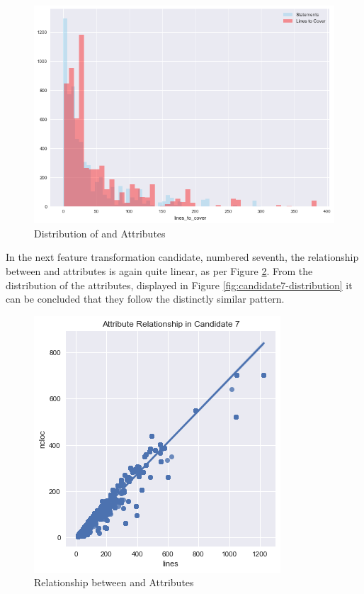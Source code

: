 \begin{figure}
    \centering
    \includegraphics[scale=0.6]{Figures/correlation/Attribute_Distribution_in_Candidate_6.png}
    \caption{Distribution of \statements{} and \linesToCover{} Attributes}
    \label{fig:candidate6-distribution}
\end{figure}

In the next feature transformation candidate, numbered seventh, the relationship between \ncloc{} and \lines{} attributes is again quite linear, as per Figure \ref{fig:candidate7-scatterplot}. From the distribution of the attributes, displayed in Figure \ref{fig:candidate7-distribution} it can be concluded that they follow the distinctly similar pattern.

\begin{figure}
    \centering
    \includegraphics[scale=0.8]{Figures/correlation/Attribute_Relationship_in_Candidate_7.png}
    \caption{Relationship between \ncloc{} and \lines{} Attributes}
    \label{fig:candidate7-scatterplot}
\end{figure}

